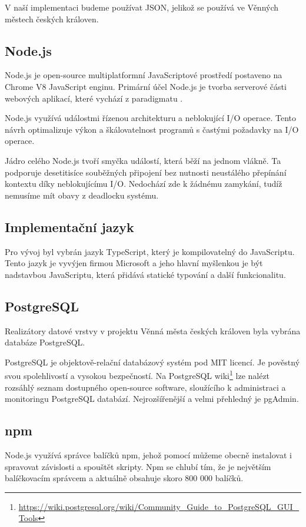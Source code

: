 \documentclass[thesis=B,czech]{FITthesis}[2012/06/26]
\begin{document}
        V naší implementaci budeme používat JSON, jelikož se používá ve Věnných městech českých královen.
        \subsection{Node.js}
            Node.js je open-source multiplatformní JavaScriptové prostředí postaveno na Chrome V8 JavaScript enginu. Primární účel Node.js je tvorba serverové části webových aplikací, které vychází z paradigmatu .
            
            Node.js využívá událostmi řízenou architekturu a neblokující I/O operace. Tento návrh optimalizuje výkon a škálovatelnost programů s častými požadavky na I/O operace.
            
            Jádro celého Node.js tvoří smyčka událostí, která běží na jednom vlákně. Ta podporuje desetitisíce souběžných připojení bez nutnosti neustálého přepínání kontextu díky neblokujícímu I/O. Nedochází zde k žádnému zamykání, tudíž nemusíme mít obavy z deadlocku systému.
            \cite{node}
        \subsection{Implementační jazyk}
            Pro vývoj byl vybrán jazyk TypeScript, který je kompilovatelný do JavaScriptu. Tento jazyk je vyvýjen firmou Microsoft a jeho hlavní myšlenkou je být nadstavbou JavaScriptu, která přidává statické typování a další funkcionalitu.
        \subsection{PostgreSQL}
            Realizátory datové vrstvy v projektu Věnná města českých královen byla vybrána databáze PostgreSQL.
            
            PostgreSQL je objektově-relační databázový systém pod MIT licencí. Je pověstný svou spolehlivostí a vysokou bezpečností. Na PostgreSQL wiki\footnote{\url{https://wiki.postgresql.org/wiki/Community_Guide_to_PostgreSQL_GUI_Tools}} lze nalézt rozsáhlý seznam dostupného open-source software, sloužícího k administraci a monitoringu PostgreSQL databází. Nejrozšířenější a velmi přehledný je pgAdmin.
            \cite{postgres}
        \subsection{npm}
            Node.js využívá správce balíčků npm, jehož pomocí můžeme obecně instalovat i spravovat závislosti a spouštět skripty. Npm se chlubí tím, že je největším balíčkovacím správcem a aktuálně obsahuje skoro 800 000 balíčků.
            \cite{modulecounts}
\end{document}
